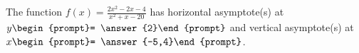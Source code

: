 \documentclass{ximera}
\author{Gregory Hartman \and Matthew Carr}
\begin{document}
\begin{exercise}





The function $f(x)=\frac{2x^2-2x-4}{x^2+x-20}$ has horizontal asymptote(s) at $y\begin{prompt}= \answer{2}\end{prompt}$ and vertical asymptote(s) at $x\begin{prompt}= \answer{-5,4}\end{prompt}$.

\end{exercise}
\end{document}
